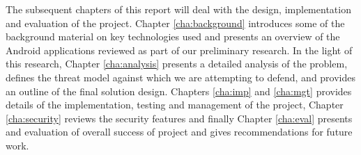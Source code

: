 The subsequent chapters of this report will deal with the design, implementation and evaluation of the project.  Chapter \ref{cha:background} introduces some of the background material on key technologies used and presents an overview of the Android applications reviewed as part of our preliminary research.  In the light of this research, Chapter \ref{cha:analysis} presents a detailed analysis of the problem, defines the threat model against which we are attempting to defend, and provides an outline of the final solution design. Chapters \ref{cha:imp} and \ref{cha:mgt} provides details of the implementation, testing and management of the project, Chapter \ref{cha:security} reviews the security features and finally Chapter \ref{cha:eval} presents and evaluation of overall success of project and gives recommendations for future work.